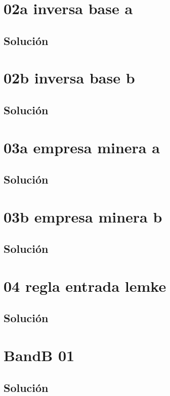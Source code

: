 \section{02a inversa base a}

\subsection*{Solución}

\clearpage
\section{02b inversa base b}

\subsection*{Solución}

\clearpage
\section{03a empresa minera a}

\subsection*{Solución}

\clearpage
\section{03b empresa minera b}

\subsection*{Solución}

\clearpage
\section{04 regla entrada lemke}

\subsection*{Solución}

\clearpage
\section{BandB 01}

\subsection*{Solución}

\clearpage
